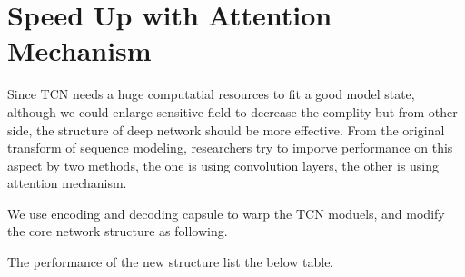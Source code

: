 \section{Speed Up with Attention Mechanism}
Since TCN needs a huge computatial resources to fit a good model state, although we could enlarge sensitive field to decrease the complity but from other side, the structure of deep network should be more effective. From the original transform of sequence modeling, researchers try to imporve performance on this aspect by two methods, the one is using convolution layers, the other is using attention mechanism.

We use encoding and decoding capsule to warp the TCN moduels, and modify the core network structure as following. 

The performance of the new structure list the below table.